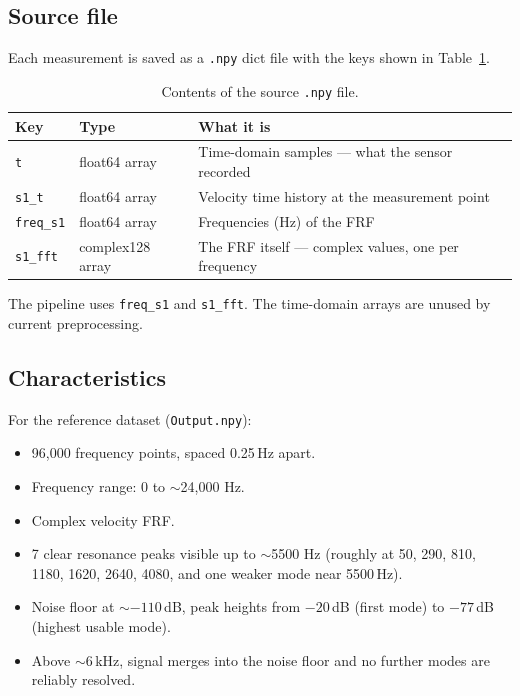 \documentclass[11pt,a4paper]{article}
\begin{document}
\subsection{Source file}

Each measurement is saved as a \texttt{.npy} dict file with the keys shown in Table~\ref{tab:datafile}.

\begin{table}[h]
\centering
\small
\begin{tabularx}{\linewidth}{l l X}
\toprule
\textbf{Key} & \textbf{Type} & \textbf{What it is} \\
\midrule
\texttt{t}        & float64 array & Time-domain samples --- what the sensor recorded \\
\texttt{s1\_t}    & float64 array & Velocity time history at the measurement point \\
\texttt{freq\_s1} & float64 array & Frequencies (Hz) of the FRF \\
\texttt{s1\_fft}  & complex128 array & The FRF itself --- complex values, one per frequency \\
\bottomrule
\end{tabularx}
\caption{Contents of the source \texttt{.npy} file.}
\label{tab:datafile}
\end{table}

The pipeline uses \texttt{freq\_s1} and \texttt{s1\_fft}. The time-domain arrays are unused by current preprocessing.

\subsection{Characteristics}

For the reference dataset (\texttt{Output.npy}):
\begin{itemize}[leftmargin=*, itemsep=2pt]
\item 96{,}000 frequency points, spaced 0.25\,Hz apart.
\item Frequency range: 0 to $\sim$24{,}000 Hz.
\item Complex velocity FRF.
\item 7 clear resonance peaks visible up to $\sim$5500 Hz (roughly at 50, 290, 810, 1180, 1620, 2640, 4080, and one weaker mode near 5500\,Hz).
\item Noise floor at $\sim -110$\,dB, peak heights from $-20$\,dB (first mode) to $-77$\,dB (highest usable mode).
\item Above $\sim 6$\,kHz, signal merges into the noise floor and no further modes are reliably resolved.
\end{itemize}
\end{document}
